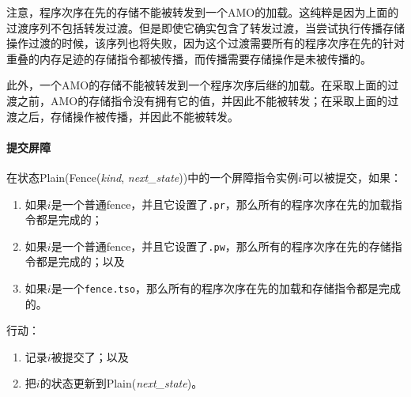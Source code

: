\begin{commentary}
  注意，程序次序在先的存储不能被转发到一个AMO的加载。这纯粹是因为上面的过渡序列不包括转发过渡。但是即使它确实包含了转发过渡，当尝试执行传播存储操作过渡的时候，该序列也将失败，因为这个过渡需要所有的程序次序在先的针对重叠的内存足迹的存储指令都被传播，而传播需要存储操作是未被传播的。

此外，一个AMO的存储不能被转发到一个程序次序后继的加载。在采取上面的过渡之前，AMO的存储指令没有拥有它的值，并因此不能被转发；在采取上面的过渡之后，存储操作被传播，并因此不能被转发。
\end{commentary}


\paragraph{提交屏障}\label{omm:commit_fence}
在状态{\sc Plain}({\sc Fence}({\it kind}, {\it next\_state}))中的一个屏障指令实例$i$可以被提交，如果：
\begin{enumerate}
\item 如果$i$是一个普通fence，并且它设置了{\tt .pr}，那么所有的程序次序在先的加载指令都是完成的； %
\item 如果$i$是一个普通fence，并且它设置了{\tt .pw}，那么所有的程序次序在先的存储指令都是完成的；以及 %
\item 如果$i$是一个{\tt fence.tso}，那么所有的程序次序在先的加载和存储指令都是完成的。 %
\end{enumerate}
行动：
\begin{enumerate}
\item 记录$i$被提交了；以及 %
\item 把$i$的状态更新到{\sc Plain}({\it next\_state})。 %
\end{enumerate}


